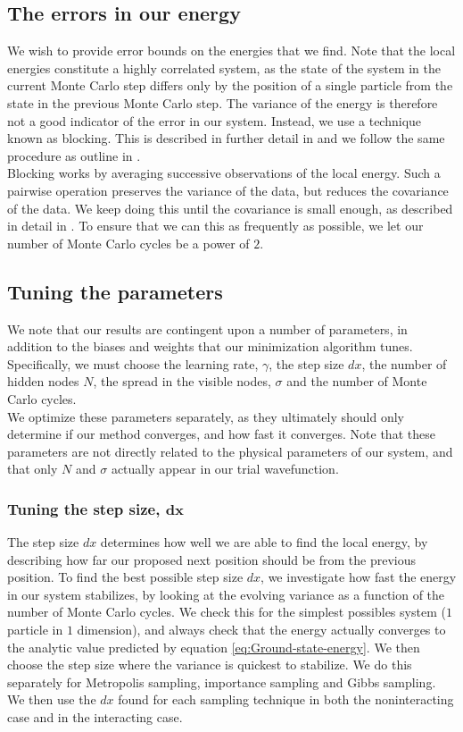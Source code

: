 \documentclass[a4paper, 10pt]{article}
\begin{document}
	\subsection{The errors in our energy}
	We wish to provide error bounds on the energies that we find. Note that the local energies constitute a highly correlated system, as the state of the system in the current Monte Carlo step differs only by the position of a single particle from the state in the previous Monte Carlo step. The variance of the energy is therefore not a good indicator of the error in our system. Instead, we use a technique known as blocking. This is described in further detail in \cite{Jonsson2018} and we follow the same procedure as outline in \cite{Heinsen2018}.\\
	\linebreak
	Blocking works by averaging successive observations of the local energy. Such a pairwise operation preserves the variance of the data, but reduces the covariance of the data. We keep doing this until the covariance is small enough, as described in detail in \cite{Jonsson2018}. To ensure that we can this as frequently as possible, we let our number of Monte Carlo cycles be a power of $2$. 
	\subsection{Tuning the parameters}\label{sec:met_tuning_parameters}
	We note that our results are contingent upon a number of parameters, in addition to the biases and weights that our minimization algorithm tunes. Specifically, we must choose the learning rate, $\gamma$, the step size $dx$, the number of hidden nodes $N$, the spread in the visible nodes, $\sigma$ and the number of Monte Carlo cycles.\\
	\linebreak
	We optimize these parameters separately, as they ultimately should only determine if our method converges, and how fast it converges. Note that these parameters are not directly related to the physical parameters of our system, and that only $N$ and $\sigma$ actually appear in our trial wavefunction.
	\subsubsection{Tuning the step size, $\boldsymbol{dx}$}
	The step size $dx$ determines how well we are able to find the local energy, by describing how far our proposed next position should be from the previous position.
	To find the best possible step size $dx$, we investigate how fast the energy in our system stabilizes, by looking at the evolving variance as a function of the number of Monte Carlo cycles. We check this for the simplest possibles system ($1$ particle in $1$ dimension), and always check that the energy actually converges to the analytic value predicted by equation \ref{eq:Ground-state-energy}. We then choose the step size where the variance is quickest to stabilize. We do this separately for Metropolis sampling, importance sampling and Gibbs sampling. We then use the $dx$ found for each sampling technique in both the noninteracting case and in the interacting case.
\end{document}
